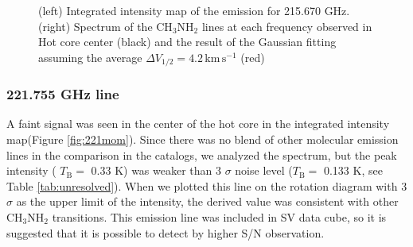 \begin{figure}[htp]
\begin{center}
\begin{minipage}{0.98\textwidth}
\begin{center}
\begin{minipage}{0.48\textwidth}
\begin{center}
\label{fig:215spec}
\end{center}
\end{minipage}
\end{center}
\end{minipage}
\caption{(left) Integrated intensity map of the emission for 215.670 GHz. (right) Spectrum of the CH$_3$NH$_2$ lines at each frequency observed in Hot core center (black)  and the result of the Gaussian fitting assuming the average $\Delta V_{1/2} = 4.2\, \mathrm{km\,s^{-1}}$ (red)}
\end{center}
\end{figure}

\subsubsection*{221.755 GHz line}
A faint signal was seen in the center of the hot core in the integrated intensity map(Figure \ref{fig:221mom}).
Since there was no blend of other molecular emission lines in the comparison in the catalogs, we analyzed the spectrum, 
but the peak intensity ( $T_{\mathrm{B}}=$ 0.33 K) was weaker than 
3 $\sigma $ noise level ($T_{\mathrm{B}}=$ 0.133 K, see Table \ref{tab:unresolved}). 
When we plotted this line on the rotation diagram with 3$\sigma$ as the upper limit of the intensity, 
the derived value was consistent with other CH$_3$NH$_2$ transitions. This emission line was included in SV data cube, 
so it is suggested that it is possible to detect by higher S/N observation.

